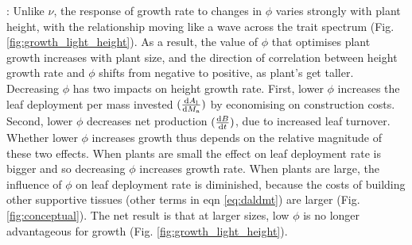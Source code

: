 \documentclass[a4paper,11pt]{article}
\begin{document}
:
Unlike $\nu$, the response of growth rate to changes in $\phi$ varies strongly with plant height, with the relationship moving like a wave across the trait spectrum (Fig. \ref{fig:growth_light_height}). As a result, the value of $\phi$ that optimises plant growth increases with plant size, and the direction of correlation between height growth rate and $\phi$ shifts from negative to positive, as plant's get taller. Decreasing $\phi$ has two impacts on height growth rate. First, lower $\phi$ increases the leaf deployment per mass invested $(\frac{{\rm d}A_{\rm l}}{{\rm d}M_{\rm a}})$ by economising on construction costs. Second, lower $\phi$ decreases net production $(\frac{{\rm d}B}{{\rm d}t})$, due to increased leaf turnover. Whether lower $\phi$ increases growth thus depends on the relative magnitude of these two effects. When plants are small the effect on leaf deployment rate is bigger and so decreasing $\phi$ increases growth rate. When plants are large, the influence of $\phi$ on leaf deployment rate is diminished, because the costs of building other supportive tissues (other terms in eqn \ref{eq:daldmt}) are larger (Fig. \ref{fig:conceptual}). The net result is that at larger sizes, low $\phi$ is no longer advantageous for growth (Fig. \ref{fig:growth_light_height}).
\end{document}
